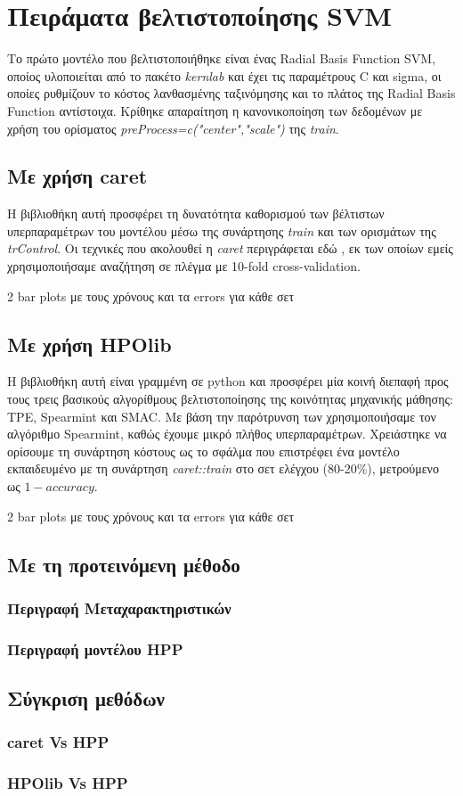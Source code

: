 \documentclass[]{article}
\numberwithin{equation}{section}		%
\numberwithin{figure}{section}			%
\numberwithin{table}{section}				%
\begin{document}
	 \section{Πειράματα βελτιστοποίησης SVM}
	 Το πρώτο μοντέλο που βελτιστοποιήθηκε είναι ένας Radial Basis Function SVM, οποίος υλοποιείται από το πακέτο \textit{kernlab} και έχει τις παραμέτρους C και sigma, οι οποίες ρυθμίζουν το κόστος λανθασμένης ταξινόμησης και το πλάτος της Radial Basis Function αντίστοιχα. Κρίθηκε απαραίτηση η κανονικοποίηση των δεδομένων με χρήση του ορίσματος \textit{ preProcess=c("center","scale")} της \textit{train}. 
	 \subsection{Με χρήση caret}
	 Η βιβλιοθήκη αυτή προσφέρει τη δυνατότητα καθορισμού των βέλτιστων υπερπαραμέτρων του μοντέλου μέσω της συνάρτησης \textit{train} και των ορισμάτων της \textit{trControl}. Οι τεχνικές που ακολουθεί η \textit{caret} περιγράφεται εδώ \citep{caret}, εκ των οποίων εμείς χρησιμοποιήσαμε αναζήτηση σε πλέγμα με 10-fold cross-validation. 
	 
	 2 bar plots με τους χρόνους και τα errors για κάθε σετ  
	 \subsection{Με χρήση HPOlib}
	 Η βιβλιοθήκη αυτή είναι γραμμένη σε python και προσφέρει μία κοινή διεπαφή προς τους τρεις βασικούς αλγορίθμους βελτιστοποίησης της κοινότητας μηχανικής μάθησης: TPE, Spearmint και SMAC. Με βάση την παρότρυνση των \citet{EggFeuBerSnoHooHutLey13} χρησιμοποιήσαμε τον αλγόριθμο Spearmint, καθώς έχουμε μικρό πλήθος υπερπαραμέτρων. Χρειάστηκε να ορίσουμε τη συνάρτηση κόστους ως το σφάλμα που επιστρέφει ένα μοντέλο εκπαιδευμένο με τη συνάρτηση \textit{caret::train} στο σετ ελέγχου (80-20\%), μετρούμενο ως $1-accuracy$. 
	 
	 2 bar plots με τους χρόνους και τα errors για κάθε σετ 
	 
	 \subsection{Με τη προτεινόμενη μέθοδο}
	 \subsubsection{Περιγραφή Μεταχαρακτηριστικών}
	 \subsubsection{Περιγραφή μοντέλου HPP}
	 \subsection{Σύγκριση μεθόδων}
	 
	 \subsubsection{caret Vs HPP}
	 \subsubsection{HPOlib Vs HPP}
	     \nocite{*}
	     \printbibliography[title= Βιβλιογραφία]
\end{document}
